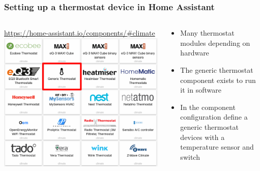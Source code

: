 \documentclass[aspectratio=169,11pt,hyperref={colorlinks=true}]{beamer}
\begin{document}
\begin{frame}
    \frametitle{Setting up a thermostat device in Home Assistant}
    \begin{columns}[T]
        \begin{column}{.48\textwidth}
            \begin{center}
                \href{https://home-assistant.io/components/\#climate}{https://home-assistant.io/components/\#climate}
                \includegraphics[width=\textwidth]{thermostat_components_2.png}
            \end{center}
        \end{column}
        \begin{column}{.48\textwidth}
            \begin{itemize}
                \item Many thermostat modules depending on hardware
                \item The generic thermostat component exists to run it in
                    software
                \item In the component configuration define a generic thermostat
                    devices with a temperature sensor and switch
            \end{itemize}
        \end{column}
    \end{columns}
\end{frame}
\end{document}
